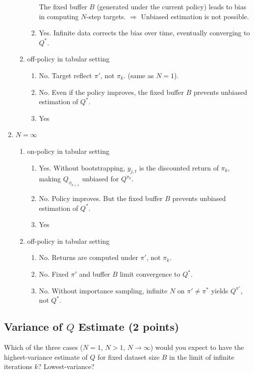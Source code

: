 \documentclass{article}
\begin{document}
\begin{tcolorbox}[answerbox, parbox=false]
\begin{enumerate}
\begin{enumerate}
\begin{enumerate}[label=\Roman*.]
        The fixed buffer $B$ (generated under the current policy) leads to bias in computing $N$-step targets. $\Rightarrow$ Unbiased estimation is not possible.
        \item Yes. Infinite data corrects the bias over time, eventually converging to $Q^*$.
      \end{enumerate}
      \item off-policy in tabular setting
      \begin{enumerate}[label=\Roman*.]
        \item No. Target reflect $\pi'$, not $\pi_k$. (same as $N=1$).
        \item No. Even if the policy improves, the fixed buffer $B$ prevents unbiased estimation of $Q^*$.
        \item Yes
      \end{enumerate}
    \end{enumerate}
    \item $N=\infty$
    \begin{enumerate}
      \item on-policy in tabular setting
      \begin{enumerate}[label=\Roman*.]
        \item Yes. Without bootstrapping, $y_{j,t}$ is the discounted return of $\pi_k$, making $Q_{\phi_{k+1}}$ unbiased for $Q^{\pi_k}$.
        \item No. Policy improves. But the fixed buffer $B$ prevents unbiased estimation of $Q^*$.
        \item Yes
      \end{enumerate}
      \item off-policy in tabular setting
      \begin{enumerate}[label=\Roman*.]
        \item No. Returns are computed under $\pi'$, not $\pi_k$.
        \item No. Fixed $\pi'$ and buffer $B$ limit convergence to $Q^*$.
        \item No. Without importance sampling, infinite $N$ on $\pi' \neq \pi^*$ yields $Q^{\pi'}$, not $Q^*$.
      \end{enumerate}
    \end{enumerate}
  \end{enumerate}
\end{tcolorbox}

\subsection{Variance of $Q$ Estimate (2 points)}
\label{q:variance_estimate}
Which of the three cases ($N = 1$, $N > 1$, $N \to \infty$) would you expect to have the highest-variance estimate of $Q$ for fixed dataset size $B$ in the limit of infinite iterations $k$? Lowest-variance?
\end{document}
